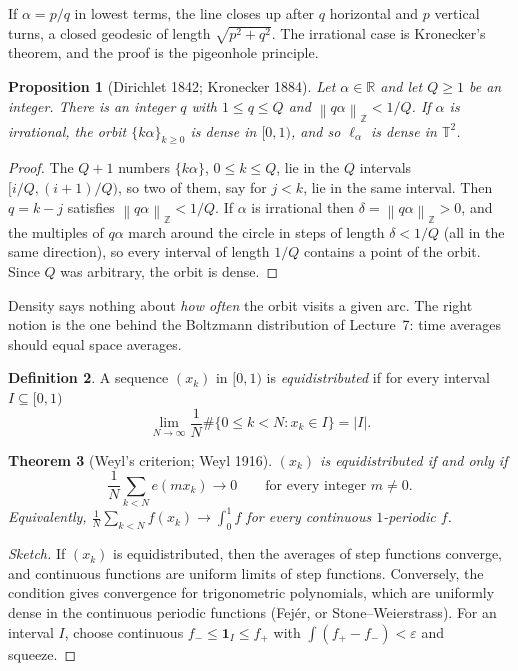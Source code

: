 \documentclass[11pt,openany]{book}
\theoremstyle{plain}
\newtheorem{theorem}{Theorem}[chapter]
\newtheorem{proposition}[theorem]{Proposition}
\theoremstyle{definition}
\newtheorem{definition}[theorem]{Definition}
\theoremstyle{remark}
\newcommand{\R}{\mathbb{R}}
\newcommand{\Z}{\mathbb{Z}}
\newcommand{\T}{\mathbb{T}}
\newcommand{\abs}[1]{\left\lvert #1 \right\rvert}
\newcommand{\norm}[1]{\left\lVert #1 \right\rVert}
\begin{document}
If $\alpha=p/q$ in lowest terms, the line closes up after $q$ horizontal and $p$ vertical turns, a
closed geodesic of length $\sqrt{p^2+q^2}$. The irrational case is Kronecker's theorem, and the proof
is the pigeonhole principle.

\begin{proposition}[Dirichlet 1842; Kronecker 1884]\label{ERG:prop:dirichlet}
Let $\alpha\in\R$ and let $Q\ge1$ be an integer. There is an integer $q$ with $1\le q\le Q$ and
$\norm{q\alpha}_\Z<1/Q$. If $\alpha$ is irrational, the orbit $\{k\alpha\}_{k\ge0}$ is dense in
$[0,1)$, and so $\ell_\alpha$ is dense in $\T^2$.
\end{proposition}

\begin{proof}
The $Q+1$ numbers $\{k\alpha\}$, $0\le k\le Q$, lie in the $Q$ intervals $[i/Q,(i+1)/Q)$, so two of
them, say for $j<k$, lie in the same interval. Then $q=k-j$ satisfies $\norm{q\alpha}_\Z<1/Q$. If
$\alpha$ is irrational then $\delta=\norm{q\alpha}_\Z>0$, and the multiples of $q\alpha$ march around
the circle in steps of length $\delta<1/Q$ (all in the same direction), so every interval of length
$1/Q$ contains a point of the orbit. Since $Q$ was arbitrary, the orbit is dense.
\end{proof}

Density says nothing about \emph{how often} the orbit visits a given arc. The right notion is the one
behind the Boltzmann distribution of Lecture~7: time averages should equal space averages.

\begin{definition}
A sequence $(x_k)$ in $[0,1)$ is \emph{equidistributed} if for every interval $I\subseteq[0,1)$
\[
  \lim_{N\to\infty}\frac1N\#\{0\le k<N: x_k\in I\}=\abs{I}.
\]
\end{definition}

\begin{theorem}[Weyl's criterion; Weyl 1916]\label{ERG:thm:weylcrit}
$(x_k)$ is equidistributed if and only if
\[
  \frac1N\sum_{k<N}e(mx_k)\to0\qquad\text{for every integer } m\neq0.
\]
Equivalently, $\frac1N\sum_{k<N}f(x_k)\to\int_0^1f$ for every continuous $1$-periodic $f$.
\end{theorem}

\begin{proof}[Sketch]
If $(x_k)$ is equidistributed, then the averages of step functions converge, and continuous functions are
uniform limits of step functions. Conversely, the condition gives convergence for trigonometric
polynomials, which are uniformly dense in the continuous periodic functions (Fej\'er, or
Stone--Weierstrass). For an interval $I$, choose continuous $f_-\le\mathbf 1_I\le f_+$ with
$\int(f_+-f_-)<\varepsilon$ and squeeze.
\end{proof}
\end{document}
